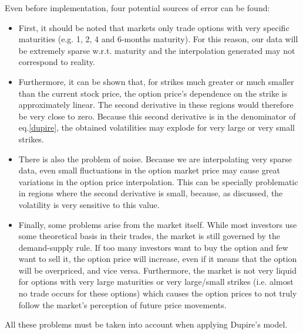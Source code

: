 Even before implementation, four potential sources of error can be found:
\begin{itemize}
\item First, it should be noted that markets only trade options with very specific maturities (e.g. 1, 2, 4 and 6-months maturity). For this reason, our data will be extremely sparse w.r.t. maturity and the interpolation generated may not correspond to reality.
\item Furthermore, it can be shown that, for strikes much greater or much smaller than the current stock price, the option price's dependence on the strike is approximately linear. The second derivative in these regions would therefore be very close to zero. Because this second derivative is in the denominator of eq.\eqref{dupire}, the obtained volatilities may explode for very large or very small strikes.
\item There is also the problem of noise. Because we are interpolating very sparse data, even small fluctuations in the option market price may cause great variations in the option price interpolation. This can be specially problematic in regions where the second derivative is small, because, as discussed, the volatility is very sensitive to this value.
\item Finally, some problems arise from the market itself. While most investors use some theoretical basis in their trades, the market is still governed by the demand-supply rule. If too many investors want to buy the option and few want to sell it, the option price will increase, even if it means that the option will be overpriced, and vice versa. Furthermore, the market is not very liquid for options with very large maturities or very large/small strikes (i.e. almost no trade occurs for these options) which causes the option prices to not truly follow the market's perception of future price movements.
\end{itemize}
All these problems must be taken into account when applying Dupire's model.




